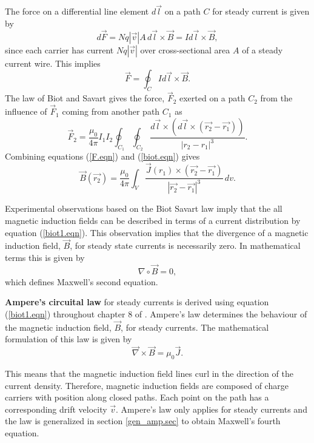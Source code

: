 \documentclass[12pt]{article}
\theoremstyle{definition}
\numberwithin{equation}{section}
\begin{document}
The force on a differential line element $d\vec{l}$ on a path $C$ for steady current is given by
$$d\vec{F}=Nq|\vec{v}|A\,d\vec{l}\times\vec{B}=Id\vec{l}\times\vec{B},$$
since each carrier has current $Nq|\vec{v}|$ over cross-sectional area $A$ of a steady current wire. This implies
\begin{equation}
\vec{F}=\oint_CId\vec{l}\times\vec{B}.
\label{F.eqn}
\end{equation}
The law of Biot and Savart gives the force, $\vec{F}_2$ exerted on a path $C_2$ from the influence of $\vec{F}_1$ coming from another path $C_1$ as
\begin{equation}
\vec{F}_2=\frac{\mu_0}{4\pi}I_1I_2\oint_{C_1}\oint_{C_2}\frac{d\vec{l}\times\left(d\vec{l}\times(\vec{r_2}-\vec{r_1})\right)}{|r_2-r_1|^3}.
\label{biot.eqn}
\end{equation}
Combining equations (\ref{F.eqn}) and (\ref{biot.eqn}) gives
\begin{equation}
\vec{B}(\vec{r_2})=\frac{\mu_0}{4\pi}\int_V\frac{\vec{J}(r_1)\times(\vec{r_2}-\vec{r_1})}{|\vec{r_2}-\vec{r_1}|^3}\,dv.
\label{biot1.eqn}
\end{equation}

Experimental observations based on the Biot Savart law imply that the all magnetic induction fields can be described in terms of a current distribution by equation (\ref{biot1.eqn}). This observation implies that the divergence of a magnetic induction field, $\vec{B}$, for steady state currents is necessarily zero. In mathematical terms this is given by
\begin{equation}
{\nabla}\circ\vec{B}=0,
\label{maxwell2.eqn}
\end{equation}
which defines Maxwell's second equation.

\textbf{Ampere's circuital law} for steady currents is derived using equation (\ref{biot1.eqn}) throughout chapter 8 of \cite{Reitz}. Ampere's law determines the behaviour of the magnetic induction field, $\vec{B}$, for steady currents. The mathematical formulation of this law is given by
\begin{equation}
\vec{\nabla}\times\vec{B}=\mu_0\vec{J}.
\label{ampere.eqn}
\end{equation}

This means that the magnetic induction field lines curl in the direction of the current density. Therefore, magnetic induction fields are composed of charge carriers with position along closed paths. Each point on the path has a corresponding drift velocity $\vec{v}$. Ampere's law only applies for steady currents and the law is generalized in section \ref{gen_amp.sec} to obtain Maxwell's fourth equation.
\end{document}
